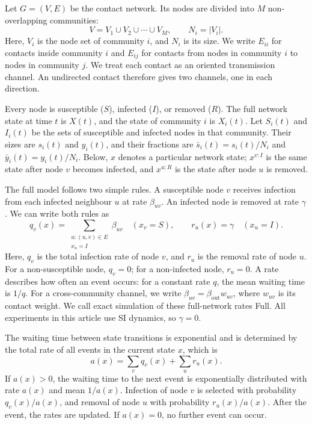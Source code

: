 \documentclass{ieeeaccess}
\newcommand{\ibar}{\bar{y}}
\newcommand{\sbar}{\bar{s}}
\newcommand{\Full}{\textup{Full}}
\begin{document}
Let $G=(V,E)$ be the contact network. Its nodes are divided into $M$ non-overlapping communities:
\begin{equation}
\label{eq:partition}
V=V_1\cup V_2\cup\cdots\cup V_M,
\qquad N_i=|V_i|.
\end{equation}
Here, $V_i$ is the node set of community $i$, and $N_i$ is its size. We write $E_{ii}$ for contacts inside community $i$ and $E_{ij}$ for contacts from nodes in community $i$ to nodes in community $j$. We treat each contact as an oriented transmission channel. An undirected contact therefore gives two channels, one in each direction.

Every node is susceptible ($S$), infected ($I$), or removed ($R$). The full network state at time $t$ is $X(t)$, and the state of community $i$ is $X_i(t)$. Let $S_i(t)$ and $I_i(t)$ be the sets of susceptible and infected nodes in that community. Their sizes are $s_i(t)$ and $y_i(t)$, and their fractions are $\sbar_i(t)=s_i(t)/N_i$ and $\ibar_i(t)=y_i(t)/N_i$. Below, $x$ denotes a particular network state; $x^{v:I}$ is the same state after node $v$ becomes infected, and $x^{u:R}$ is the state after node $u$ is removed.

The full model follows two simple rules. A susceptible node $v$ receives infection from each infected neighbour $u$ at rate $\beta_{uv}$. An infected node is removed at rate $\gamma$. We can write both rules as
\begin{equation}
\label{eq:full_generator}
q_v(x)=\sum_{\substack{u:(u,v)\in E\\x_u=I}}\beta_{uv}
\quad (x_v=S),
\qquad r_u(x)=\gamma\quad (x_u=I).
\end{equation}
Here, $q_v$ is the total infection rate of node $v$, and $r_u$ is the removal rate of node $u$. For a non-susceptible node, $q_v=0$; for a non-infected node, $r_u=0$. A rate describes how often an event occurs: for a constant rate $q$, the mean waiting time is $1/q$. For a cross-community channel, we write $\beta_{uv}=\beta_{\mathrm{out}}w_{uv}$, where $w_{uv}$ is its contact weight. We call exact simulation of these full-network rates \Full{}. All experiments in this article use SI dynamics, so $\gamma=0$.

The waiting time between state transitions is exponential and is determined by the total rate of all events in the current state $x$, which is
\[
a(x)=\sum_v q_v(x)+\sum_u r_u(x).
\]
If $a(x)>0$, the waiting time to the next event is exponentially distributed with rate $a(x)$ and mean $1/a(x)$. Infection of node $v$ is selected with probability $q_v(x)/a(x)$, and removal of node $u$ with probability $r_u(x)/a(x)$. After the event, the rates are updated. If $a(x)=0$, no further event can occur.
\end{document}
